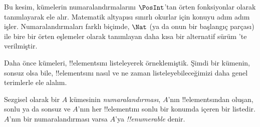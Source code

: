 \documentclass[../../../include/open-logic-section]{subfiles}
\begin{document}


\begin{editorial}
  Bu kesim, kümelerin numaralandırmalarını $\PosInt$'tan örten fonksiyonlar
  olarak tanımlayarak ele alır. Matematik altyapısı sınırlı okurlar için
  konuyu adım adım işler. Numaralandırmaları farklı biçimde, $\Nat$ (ya da
  onun bir başlangıç parçası) ile bire bir örten eşlemeler olarak tanımlayan
  daha kısa bir alternatif sürüm 'te verilmiştir.
\end{editorial}

\begin{explain}
Daha önce kümeleri, !!{element}s{}ını listeleyerek örneklemiştik. Şimdi bir
kümenin, sonsuz olsa bile, !!{element}s{}ını nasıl ve ne zaman
listeleyebileceğimizi daha genel terimlerle ele alalım.
\end{explain}

\begin{defn}
Sezgisel olarak bir $A$ kümesinin \emph{numaralandırması}, $A$'nın
!!{element}s{}ından oluşan, sonlu ya da sonsuz ve $A$'nın her !!{element}{}ını
sonlu bir konumda içeren bir listedir. $A$'nın bir numaralandırması varsa
$A$'ya \emph{!!{enumerable}} denir.
\end{defn}
\end{document}
